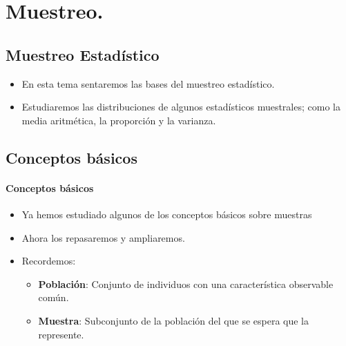  

\chapter{Muestreo.}


\section{Muestreo Estadístico}
  \begin{frame}
\begin{itemize}
   \item En esta tema sentaremos las bases del muestreo estadístico.
   \item Estudiaremos las distribuciones de algunos estadísticos muestrales; como la media aritmética, la proporción y la varianza.
  \end{itemize}
\end{frame}

\section{Conceptos básicos}
\begin{frame}
\frametitle{Conceptos básicos}
\begin{itemize}
 \item Ya hemos estudiado algunos de los conceptos básicos sobre muestras
\item Ahora los repasaremos y ampliaremos.
\item Recordemos:
  \begin{itemize}
  \item \textbf{Población}: Conjunto de individuos con una característica observable
  común.
  \item \textbf{Muestra}: Subconjunto de la población del que se espera que la
  represente.
\end{itemize}
\end{itemize}
\end{frame}

